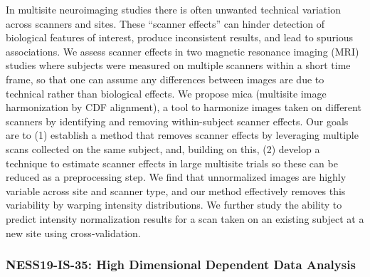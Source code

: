 \begin{itemize}
In multisite neuroimaging studies there is often unwanted technical variation across scanners and sites. These “scanner effects” can hinder detection of biological features of interest, produce inconsistent results, and lead to spurious associations. We assess scanner effects in two magnetic resonance imaging (MRI) studies where subjects were measured on multiple scanners within a short time frame, so that one can assume any differences between images are due to technical rather than biological effects. We propose mica (multisite image harmonization by CDF alignment), a tool to harmonize images taken on different scanners by identifying and removing within-subject scanner effects. Our goals are to (1) establish a method that removes scanner effects by leveraging multiple scans collected on the same subject, and, building on this, (2) develop a technique to estimate scanner effects in large multisite trials so these can be reduced as a preprocessing step. We find that unnormalized images are highly variable across site and scanner type, and our method effectively removes this variability by warping intensity distributions. We further study the ability to predict intensity normalization results for a scan taken on an existing subject at a new site using cross-validation.

\end{itemize}

\subsubsection*{NESS19-IS-35: High Dimensional Dependent Data Analysis}

